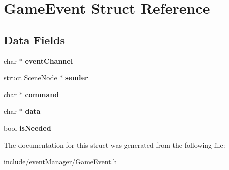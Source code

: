 \hypertarget{struct_game_event}{}\section{Game\+Event Struct Reference}
\label{struct_game_event}
\subsection*{Data Fields}
\begin{DoxyCompactItemize}
\item 
\hypertarget{struct_game_event_a7dda51a2020c9e6ea2d284527a6c0a3c}{}\label{struct_game_event_a7dda51a2020c9e6ea2d284527a6c0a3c} 
char $\ast$ {\bfseries event\+Channel}
\item 
\hypertarget{struct_game_event_a66ff5dae3a3a9fa193714623f219c11d}{}\label{struct_game_event_a66ff5dae3a3a9fa193714623f219c11d} 
struct \hyperlink{struct_scene_node}{Scene\+Node} $\ast$ {\bfseries sender}
\item 
\hypertarget{struct_game_event_ade9cba72805fe52685a1deea307a8e82}{}\label{struct_game_event_ade9cba72805fe52685a1deea307a8e82} 
char $\ast$ {\bfseries command}
\item 
\hypertarget{struct_game_event_a91a70b77df95bd8b0830b49a094c2acb}{}\label{struct_game_event_a91a70b77df95bd8b0830b49a094c2acb} 
char $\ast$ {\bfseries data}
\item 
\hypertarget{struct_game_event_a1c2e66c0da32aeb6b56a788ad2beee8c}{}\label{struct_game_event_a1c2e66c0da32aeb6b56a788ad2beee8c} 
bool {\bfseries is\+Needed}
\end{DoxyCompactItemize}


The documentation for this struct was generated from the following file\+:\begin{DoxyCompactItemize}
\item 
include/event\+Manager/Game\+Event.\+h\end{DoxyCompactItemize}
